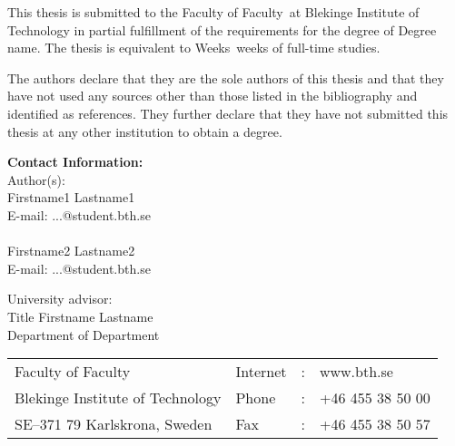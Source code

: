 \documentclass[a4paper,twoside]{bth}
\makeatletter
\newcommand{\thesisDegree}{Degree name}
\newcommand{\faculty}{Faculty}
\newcommand{\thesisWeeks}{Weeks}
\newcommand{\authorFirst}{Firstname1 Lastname1}
\newcommand{\authorFirstMail}{...@student.bth.se}
\newcommand{\authorSecond}{Firstname2 Lastname2}
\newcommand{\authorSecondMail}{...@student.bth.se}
\newcommand{\super}{Title Firstname Lastname}
\newcommand{\superAffiliation}{Department}
\makeatother
\begin{document}
{\pagestyle{empty}
\changepage{3cm}{1cm}{-0.5cm}{-0.5cm}{}{-1.5cm}{}{}{}

{\small
\noindent
This thesis is submitted to the Faculty of \faculty\ at Blekinge Institute
of Technology in partial fulfillment of the requirements for the degree of
\thesisDegree. The thesis is equivalent to \thesisWeeks\ weeks of full-time studies.

\vspace{1cm}

\noindent
The authors declare that they are the sole authors of this thesis and that they have
not used any sources other than those listed in the bibliography and identified as references.
They further declare that they have not submitted this thesis at any other institution to
obtain a degree.
}

\vspace{10cm}

\noindent
\textbf{Contact Information:} \\
Author(s): \\
\authorFirst \\
E-mail: \authorFirstMail \\
\\
\authorSecond \\
E-mail: \authorSecondMail

\vspace{2cm}

\noindent
University advisor: \\
\super \\
Department of \superAffiliation

\vspace*{\fill}

\noindent
\begin{tabular}{@{}p{} l c l}
Faculty of \faculty              & Internet & : & www.bth.se \\
Blekinge Institute of Technology & Phone    & : & +46 455 38 50 00 \\
SE--371 79 Karlskrona, Sweden    & Fax      & : & +46 455 38 50 57 \\
\end{tabular}
\clearpage
} %

\setcounter{page}{1}

\end{document}
